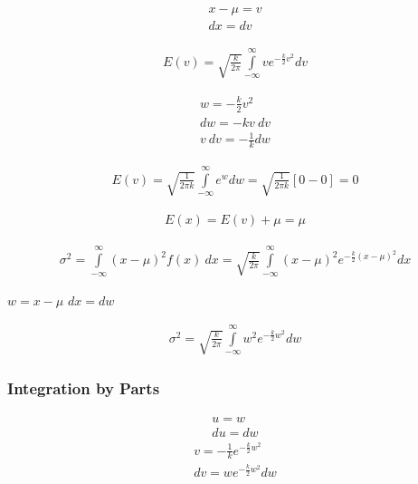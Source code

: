 \documentclass{article}
\begin{document}
\begin{align*}
  x-\mu = v\\
  dx=dv
\end{align*}

\begin{align}
  E(v)=\sqrt{\frac{k}{2\pi}}\int\limits_{-\infty}^{\infty}ve^{-\frac{k}{2}v^2}dv 
\end{align}

\begin{align*}
  w=-\frac{k}{2}v^2\\
  dw=-kv\ dv\\
  v\ dv = -\frac{1}{k}dw
\end{align*}

\begin{align}
  E(v)=\sqrt{\frac{1}{2\pi k}}\int\limits_{-\infty}^{\infty}e^{w}dw = \sqrt{\frac{1}{2\pi k}}[0-0] = 0
\end{align}


\begin{align*}
  E(x)=E(v)+\mu = \mu
\end{align*}

\begin{align}
  \sigma^{2}=\int\limits_{-\infty}^{\infty}\left( x-\mu \right)^2 f(x)\ dx = \sqrt{\frac{k}{2\pi}} \int\limits_{-\infty}^{\infty}\left( x-\mu \right)^2 e^{-\frac{k}{2}\left( x-\mu \right)^2}dx
\end{align}

\begin{multicols}{2}
  $w=x-\mu$
  \vfill\columnbreak
  $dx=dw$
\end{multicols}

\begin{align}
  \sigma^2=\sqrt{\frac{k}{2\pi}}\int\limits_{-\infty}^{\infty}w^2 e^{-\frac{k}{2}w^2}dw
\end{align}

\subsubsection{Integration by Parts}

\begin{multicols}{2}
  \begin{align*}
    u=w\\
    du=dw
  \end{align*}
  \vfill\columnbreak
  \begin{align*}
    v=-\frac{1}{k}e^{-\frac{k}{2}w^2}\\
    dv=we^{-\frac{k}{2}w^2}dw
  \end{align*}
\end{multicols}
\end{document}
